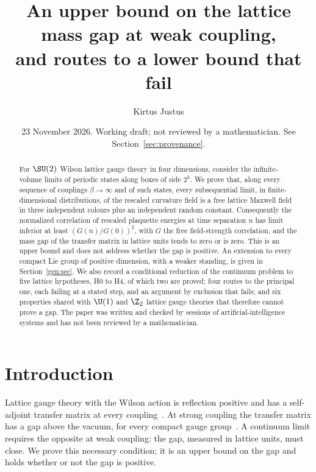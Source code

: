 
\title[An upper bound on the lattice mass gap at weak coupling]{An upper bound on the lattice mass gap at weak coupling,\\ and routes to a lower bound that fail}
\author{Kirtus Justus}
\address{Theoretical Physicist, Port Coquitlam, British Columbia, Canada}
\date{23 November 2026. Working draft; not reviewed by a mathematician. See Section~\ref{sec:provenance}.}

\begin{abstract}
For $\SU(2)$ Wilson lattice gauge theory in four dimensions, consider the infinite-volume limits of periodic states along boxes of side $2^k$. We prove that, along every sequence of couplings $\beta\to\infty$ and of such states, every subsequential limit, in finite-dimensional distributions, of the rescaled curvature field is a free lattice Maxwell field in three independent colours plus an independent random constant. Consequently the normalized correlation of rescaled plaquette energies at time separation $n$ has limit inferior at least $(G(n)/G(0))^2$, with $G$ the free field-strength correlation, and the mass gap of the transfer matrix in lattice units tends to zero or is zero. This is an upper bound and does not address whether the gap is positive. An extension to every compact Lie group of positive dimension, with a weaker standing, is given in Section~\ref{gen:sec}. We also record a conditional reduction of the continuum problem to five lattice hypotheses, H0 to H4, of which two are proved; four routes to the principal one, each failing at a stated step, and an argument by exclusion that fails; and six properties shared with $\U(1)$ and $\Z_2$ lattice gauge theories that therefore cannot prove a gap. The paper was written and checked by sessions of artificial-intelligence systems and has not been reviewed by a mathematician.
\end{abstract}
\maketitle

\section{Introduction}\label{sec:intro}

Lattice gauge theory with the Wilson action is reflection positive and has a self-adjoint transfer matrix at every coupling~\cite{OS78,Lu77}. At strong coupling the transfer matrix has a gap above the vacuum, for every compact gauge group~\cite{OS78}. A continuum limit requires the opposite at weak coupling: the gap, measured in lattice units, must close. We prove this necessary condition; it is an upper bound on the gap and holds whether or not the gap is positive.

